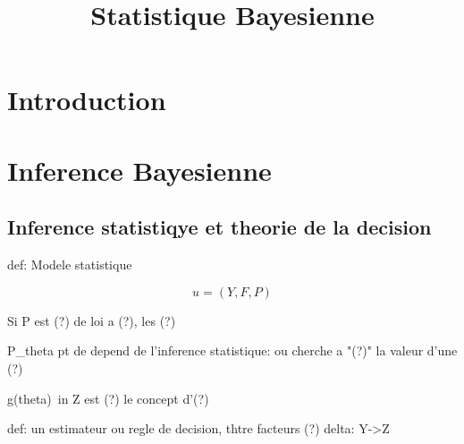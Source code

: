 \documentclass{book}
\title{Statistique Bayesienne}
\begin{document}
\maketitle

\tableofcontents
\chapter{Introduction}
\chapter{Inference Bayesienne}
\section{Inference statistiqye et theorie de la decision}
def: Modele statistique

\begin{equation}
u = (Y,F,P)
\end{equation}
	
Si P est (?) de loi a (?), les (?) 

P_theta
pt de depend de l'inference statistique:
ou cherche a "(?)" la valeur d'une (?)

g(theta)\ in Z est (?) le concept d'(?)

def: un estimateur ou regle de decision, thtre facteurs (?)
delta: Y->Z
\end{document}
